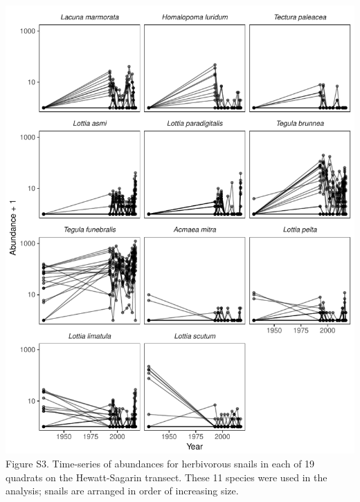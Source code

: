 \documentclass[11pt,]{article}
\begin{document}
\includegraphics[width=1.00000\textwidth]{../../figs_ms/abund_year_raw_subset_herb.pdf}
Figure S3. Time-series of abundances for herbivorous snails in each of
19 quadrats on the Hewatt-Sagarin transect. These 11 species were used
in the analysis; snails are arranged in order of increasing size.
\end{document}
